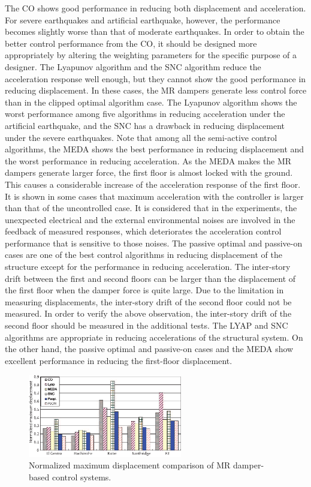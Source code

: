 The CO shows good performance in reducing both displacement and acceleration. For severe earthquakes and artificial earthquake, however, the performance becomes slightly worse than that of moderate earthquakes. In order to obtain the better control performance from the CO, it should be designed more appropriately by altering the weighting parameters for the specific purpose of a designer. The Lyapunov algorithm and the SNC algorithm reduce the acceleration response well enough, but they cannot show the good performance in reducing displacement. In these cases, the MR dampers generate less control force than in the clipped optimal algorithm case. The Lyapunov algorithm shows the worst performance among five algorithms in reducing acceleration under the artificial earthquake, and the SNC has a drawback in reducing displacement under the severe earthquakes.
Note that among all the semi-active control algorithms, the MEDA shows the best performance in reducing displacement and the worst performance in reducing acceleration. As the MEDA makes the MR dampers generate larger force, the first floor is almost locked with the ground. This causes a considerable increase of the acceleration response of the first floor.
It is shown in some cases that maximum acceleration with the controller is larger than that of the uncontrolled case. It is considered that in the experiments, the unexpected electrical and the external environmental noises are involved in the feedback of measured responses, which deteriorates the acceleration control performance that is sensitive to those noises. The passive optimal and passive-on cases are one of the best control algorithms in reducing displacement of the structure except for the performance in reducing acceleration.
The inter-story drift between the first and second floors can be larger than the displacement of the first floor when the damper force is quite large. Due to the limitation in measuring displacements, the inter-story drift of the second floor could not be measured. In order to verify the above observation, the inter-story drift of the second floor should be measured in the additional tests. The LYAP and SNC algorithms are appropriate in reducing accelerations of the structural system. On the other hand, the passive optimal and passive-on cases and the MEDA show excellent performance in reducing the first-floor displacement.

\begin{figure}[!ht]
\centering
\includegraphics[width=0.6\textwidth] {figure/n3-14.eps}
\caption{Normalized maximum displacement comparison of MR damper-based control systems.}
\label{fig:n3-14}
\end{figure}

